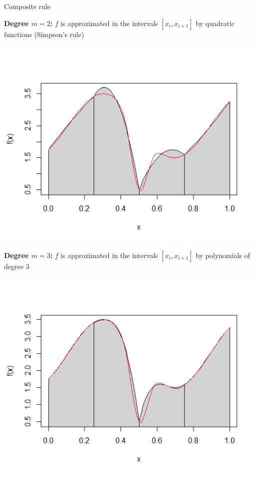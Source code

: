 \begin{vbframe}{Composite rule}



\framebreak

\textbf{Degree $m = 2$:} $f$ is approximated in the intervals $[x_i, x_{i + 1}]$ by quadratic functions (Simpson's rule)


\begin{center}
\includegraphics[width = .7\textwidth]{figure_man/deg2.png}
\end{center}


\framebreak

\textbf{Degree $m = 3$:} $f$ is approximated in the intervals $[x_i, x_{i + 1}]$ by polynomials of degree $3$

\begin{center}
\includegraphics[width = .7\textwidth]{figure_man/deg3.png}
\end{center}


\end{vbframe}
